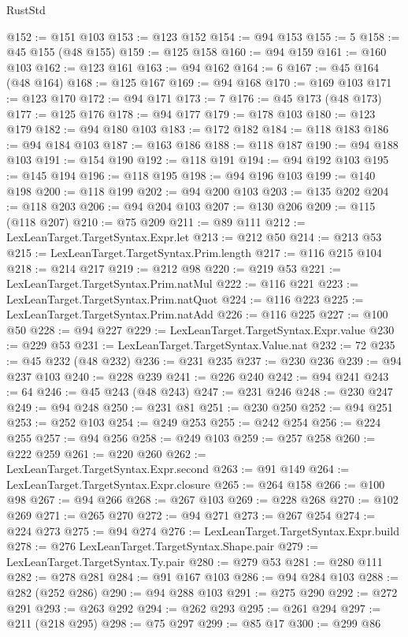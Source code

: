 \begin{lexlean}{RustStd}
\begin{coremodule}
@152 := @151 @103
@153 := @123 @152
@154 := @94 @153
@155 := 5
@158 := @45 @155 (@48 @155)
@159 := @125 @158
@160 := @94 @159
@161 := @160 @103
@162 := @123 @161
@163 := @94 @162
@164 := 6
@167 := @45 @164 (@48 @164)
@168 := @125 @167
@169 := @94 @168
@170 := @169 @103
@171 := @123 @170
@172 := @94 @171
@173 := 7
@176 := @45 @173 (@48 @173)
@177 := @125 @176
@178 := @94 @177
@179 := @178 @103
@180 := @123 @179
@182 := @94 @180 @103
@183 := @172 @182
@184 := @118 @183
@186 := @94 @184 @103
@187 := @163 @186
@188 := @118 @187
@190 := @94 @188 @103
@191 := @154 @190
@192 := @118 @191
@194 := @94 @192 @103
@195 := @145 @194
@196 := @118 @195
@198 := @94 @196 @103
@199 := @140 @198
@200 := @118 @199
@202 := @94 @200 @103
@203 := @135 @202
@204 := @118 @203
@206 := @94 @204 @103
@207 := @130 @206
@209 := @115 (@118 @207)
@210 := @75 @209
@211 := @89 @111
@212 := LexLeanTarget.TargetSyntax.Expr.let
@213 := @212 @50
@214 := @213 @53
@215 := LexLeanTarget.TargetSyntax.Prim.length
@217 := @116 @215 @104
@218 := @214 @217
@219 := @212 @98
@220 := @219 @53
@221 := LexLeanTarget.TargetSyntax.Prim.natMul
@222 := @116 @221
@223 := LexLeanTarget.TargetSyntax.Prim.natQuot
@224 := @116 @223
@225 := LexLeanTarget.TargetSyntax.Prim.natAdd
@226 := @116 @225
@227 := @100 @50
@228 := @94 @227
@229 := LexLeanTarget.TargetSyntax.Expr.value
@230 := @229 @53
@231 := LexLeanTarget.TargetSyntax.Value.nat
@232 := 72
@235 := @45 @232 (@48 @232)
@236 := @231 @235
@237 := @230 @236
@239 := @94 @237 @103
@240 := @228 @239
@241 := @226 @240
@242 := @94 @241
@243 := 64
@246 := @45 @243 (@48 @243)
@247 := @231 @246
@248 := @230 @247
@249 := @94 @248
@250 := @231 @81
@251 := @230 @250
@252 := @94 @251
@253 := @252 @103
@254 := @249 @253
@255 := @242 @254
@256 := @224 @255
@257 := @94 @256
@258 := @249 @103
@259 := @257 @258
@260 := @222 @259
@261 := @220 @260
@262 := LexLeanTarget.TargetSyntax.Expr.second
@263 := @91 @149
@264 := LexLeanTarget.TargetSyntax.Expr.closure
@265 := @264 @158
@266 := @100 @98
@267 := @94 @266
@268 := @267 @103
@269 := @228 @268
@270 := @102 @269
@271 := @265 @270
@272 := @94 @271
@273 := @267 @254
@274 := @224 @273
@275 := @94 @274
@276 := LexLeanTarget.TargetSyntax.Expr.build
@278 := @276 LexLeanTarget.TargetSyntax.Shape.pair
@279 := LexLeanTarget.TargetSyntax.Ty.pair
@280 := @279 @53
@281 := @280 @111
@282 := @278 @281
@284 := @91 @167 @103
@286 := @94 @284 @103
@288 := @282 (@252 @286)
@290 := @94 @288 @103
@291 := @275 @290
@292 := @272 @291
@293 := @263 @292
@294 := @262 @293
@295 := @261 @294
@297 := @211 (@218 @295)
@298 := @75 @297
@299 := @85 @17
@300 := @299 @86

\end{coremodule}
\end{lexlean}
